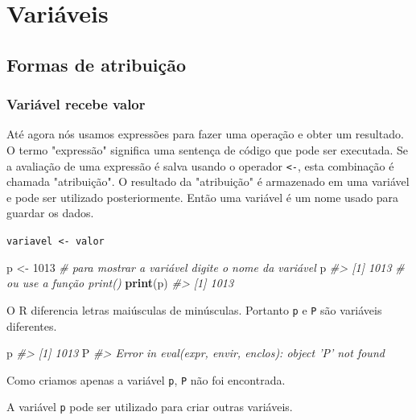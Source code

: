 \documentclass[]{book}
\newenvironment{Shaded}{\begin{snugshade}}{\end{snugshade}}
\newcommand{\KeywordTok}[1]{\textcolor[rgb]{0.13,0.29,0.53}{\textbf{#1}}}
\newcommand{\DecValTok}[1]{\textcolor[rgb]{0.00,0.00,0.81}{#1}}
\newcommand{\StringTok}[1]{\textcolor[rgb]{0.31,0.60,0.02}{#1}}
\newcommand{\CommentTok}[1]{\textcolor[rgb]{0.56,0.35,0.01}{\textit{#1}}}
\newcommand{\NormalTok}[1]{#1}
\begin{document}
\section{Variáveis}\label{variaveis}

\subsection{Formas de atribuição}\label{formas-de-atribuicao}

\subsubsection{Variável recebe valor}\label{variavel-recebe-valor}

Até agora nós usamos expressões para fazer uma operação e obter um
resultado. O termo "expressão" significa uma sentença de código que pode
ser executada. Se a avaliação de uma expressão é salva usando o operador
\texttt{\textless{}-}, esta combinação é chamada "atribuição". O
resultado da "atribuição" é armazenado em uma variável e pode ser
utilizado posteriormente. Então uma variável é um nome usado para
guardar os dados.

\texttt{variavel\ \textless{}-\ valor}

\begin{Shaded}
\begin{Highlighting}[]
\NormalTok{p <-}\StringTok{ }\DecValTok{1013}
\CommentTok{# para mostrar a variável digite o nome da variável}
\NormalTok{p}
\CommentTok{#> [1] 1013}
\CommentTok{# ou use a função print()}
\KeywordTok{print}\NormalTok{(p)}
\CommentTok{#> [1] 1013}
\end{Highlighting}
\end{Shaded}

O R diferencia letras maiúsculas de minúsculas. Portanto \texttt{p} e
\texttt{P} são variáveis diferentes.

\begin{Shaded}
\begin{Highlighting}[]
\NormalTok{p}
\CommentTok{#> [1] 1013}
\NormalTok{P}
\CommentTok{#> Error in eval(expr, envir, enclos): object 'P' not found}
\end{Highlighting}
\end{Shaded}

Como criamos apenas a variável \texttt{p}, \texttt{P} não foi
encontrada.

A variável \texttt{p} pode ser utilizado para criar outras variáveis.
\end{document}
